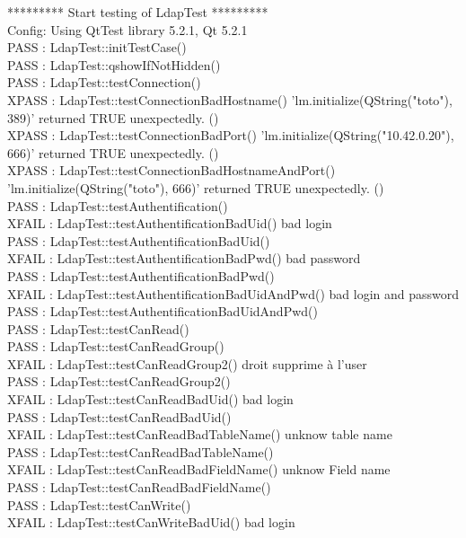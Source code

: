 \documentclass[11pt,fleqn]{report}
\begin{document}
********* Start testing of LdapTest *********\\
Config: Using QtTest library 5.2.1, Qt 5.2.1\\
PASS   : LdapTest::initTestCase()\\
PASS   : LdapTest::qshowIfNotHidden()\\
PASS   : LdapTest::testConnection()\\
XPASS  : LdapTest::testConnectionBadHostname() 'lm.initialize(QString("toto"), 389)' returned TRUE unexpectedly. ()\\
XPASS  : LdapTest::testConnectionBadPort() 'lm.initialize(QString("10.42.0.20"), 666)' returned TRUE unexpectedly. ()\\
XPASS  : LdapTest::testConnectionBadHostnameAndPort() 'lm.initialize(QString("toto"), 666)' returned TRUE unexpectedly. ()\\
PASS   : LdapTest::testAuthentification()\\
XFAIL  : LdapTest::testAuthentificationBadUid() bad login\\
PASS   : LdapTest::testAuthentificationBadUid()\\
XFAIL  : LdapTest::testAuthentificationBadPwd() bad password\\
PASS   : LdapTest::testAuthentificationBadPwd()\\
XFAIL  : LdapTest::testAuthentificationBadUidAndPwd() bad login and password\\
PASS   : LdapTest::testAuthentificationBadUidAndPwd()\\
PASS   : LdapTest::testCanRead()\\
PASS   : LdapTest::testCanReadGroup()\\
XFAIL  : LdapTest::testCanReadGroup2() droit supprime à l'user\\
PASS   : LdapTest::testCanReadGroup2()\\
XFAIL  : LdapTest::testCanReadBadUid() bad login\\
PASS   : LdapTest::testCanReadBadUid()\\
XFAIL  : LdapTest::testCanReadBadTableName() unknow table name\\
PASS   : LdapTest::testCanReadBadTableName()\\
XFAIL  : LdapTest::testCanReadBadFieldName() unknow Field name\\
PASS   : LdapTest::testCanReadBadFieldName()\\
PASS   : LdapTest::testCanWrite()\\
XFAIL  : LdapTest::testCanWriteBadUid() bad login\\
\end{document}
